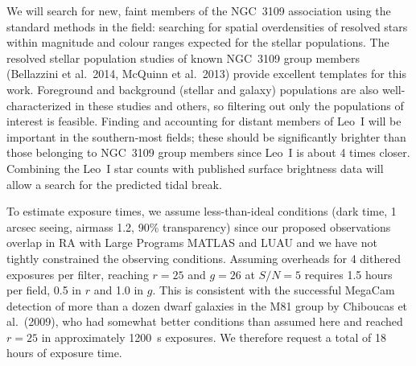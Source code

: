 We will search for new, faint members of the NGC~3109 association using the standard methods in the field:
searching for spatial overdensities of resolved stars within magnitude and colour ranges expected for the stellar populations.
The resolved stellar population studies of known NGC~3109 group members (Bellazzini et al.\ 2014, McQuinn et al.\ 2013) 
provide excellent templates for this work. Foreground and background (stellar and galaxy) populations are also well-characterized in these
studies and others, so filtering out only the populations of interest is feasible. Finding and accounting for distant members of Leo~I
will be important in the southern-most fields; these should be significantly brighter than those 
belonging to  NGC~3109 group members since Leo~I is about 4 times closer. Combining the Leo~I star counts with
published surface brightness data will allow a search for the predicted tidal break.


To estimate exposure times, we assume less-than-ideal conditions (dark time, 1 arcsec seeing, airmass 1.2, 90\% transparency)
since our proposed observations  overlap in RA with Large Programs MATLAS and LUAU and we have not
tightly constrained the observing
conditions. Assuming overheads for 4 dithered exposures per filter, reaching 
$r=25$ and $g=26$ at $S/N=5$ requires 1.5 hours per field, 0.5 in $r$ and 1.0 in $g$.
This is consistent with the successful MegaCam detection of more than a 
dozen dwarf galaxies in the M81 group by Chiboucas et al.\ (2009), who had somewhat
better conditions than assumed here and reached $r=25$ in approximately 1200~s exposures.
We therefore request a total of 18 hours of exposure time.


